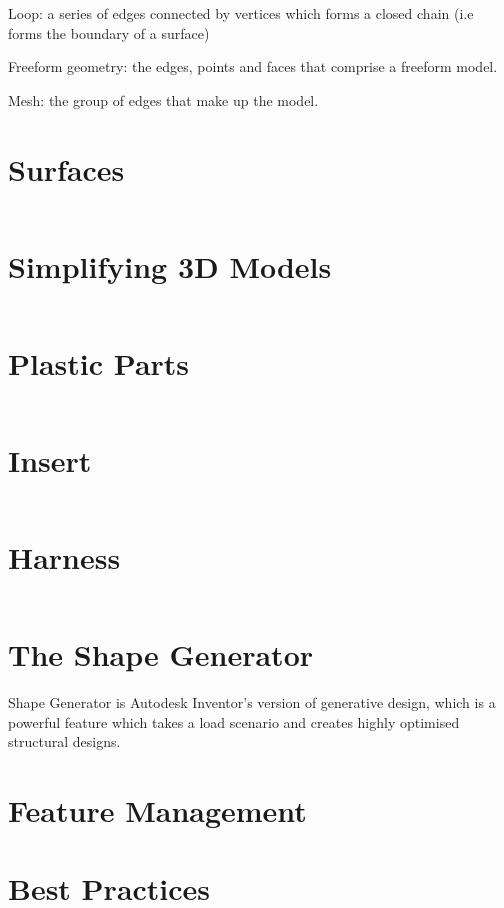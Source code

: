 Loop: a series of edges connected by vertices which forms a closed chain (i.e forms the boundary of a surface)

Freeform geometry: the edges, points and faces that comprise a freeform model.

Mesh: the group of edges that make up the model.

\section{Surfaces}
\label{section: 3D Model Surface}

$ $

\section{Simplifying 3D Models}

$ $

\section{Plastic Parts}

$ $

\section{Insert}

$ $

\section{Harness}

$ $

\section{The Shape Generator}
Shape Generator is Autodesk Inventor's version of generative design, which is a powerful feature which takes a load scenario and creates highly optimised structural designs.

\section{Feature Management}

\section{Best Practices}